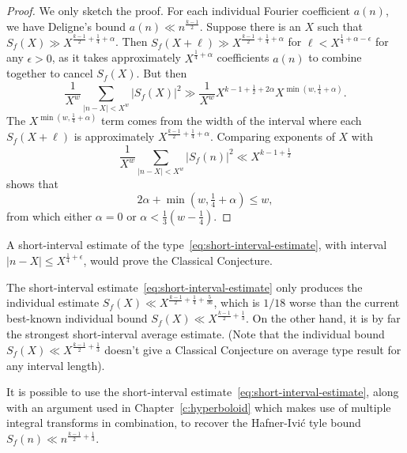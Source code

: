 \begin{proof}
  We only sketch the proof.
  For each individual Fourier coefficient $a(n)$, we have Deligne's bound $a(n) \ll
  n^{\frac{k-1}{2}}$.
  Suppose there is an $X$ such that $S_f(X) \gg X^{\frac{k-1}{2} + \frac{1}{4} + \alpha}$.
  Then $S_f(X + \ell) \gg X^{\frac{k-1}{2} + \frac{1}{4} + \alpha}$ for $\ell <
  X^{\frac{1}{4} + \alpha - \epsilon}$ for any $\epsilon > 0$, as it takes approximately
  $X^{\frac{1}{4} + \alpha}$ coefficients $a(n)$ to combine together to cancel $S_f(X)$.
  But then
  \begin{equation}
    \frac{1}{X^w} \sum_{\lvert n - X \rvert < X^w} \lvert S_f(X) \rvert^2 \gg
    \frac{1}{X^w} X^{k-1 + \frac{1}{2} + 2\alpha} X^{\min(w, \frac{1}{4} + \alpha)}.
  \end{equation}
  The $X^{\min(w, \frac{1}{4} + \alpha)}$ term comes from the width of the interval where
  each $S_f(X + \ell)$ is approximately $X^{\frac{k-1}{2} + \frac{1}{4} + \alpha}$.
  Comparing exponents of $X$ with
  \begin{equation}
    \frac{1}{X^w} \sum_{\lvert n - X \rvert < X^w} \lvert S_f(n) \rvert^2 \ll X^{k - 1 +
    \frac{1}{2}}
  \end{equation}
  shows that
  \begin{equation}
    2\alpha + \min(w, \tfrac{1}{4} + \alpha) \leq w,
  \end{equation}
  from which either $\alpha = 0$ or $\alpha < \tfrac{1}{3}( w - \tfrac{1}{4})$.
\end{proof}


\begin{corollary}
  A short-interval estimate of the type~\eqref{eq:short-interval-estimate}, with interval
  $\lvert n-X \rvert \leq X^{\frac{1}{4} + \epsilon}$, would prove the Classical
  Conjecture.
\end{corollary}

The short-interval estimate~\eqref{eq:short-interval-estimate} only produces the
individual estimate $S_f(X) \ll X^{\frac{k-1}{2} + \frac{1}{4} + \frac{5}{36}}$, which is
$1/18$ worse than the current best-known individual bound $S_f(X) \ll X^{\frac{k-1}{2} +
\frac{1}{3}}$.
On the other hand, it is by far the strongest short-interval average estimate.
(Note that the individual bound $S_f(X) \ll X^{\frac{k-1}{2} + \frac{1}{3}}$ doesn't give
a Classical Conjecture on average type result for any interval length).


\begin{remark}
  It is possible to use the short-interval estimate~\eqref{eq:short-interval-estimate},
  along with an argument used in Chapter~\ref{c:hyperboloid} which makes use of multiple
  integral transforms in combination, to recover the Hafner-Ivi\'c tyle bound $S_f(n) \ll
  n^{\frac{k-1}{2} + \frac{1}{3}}$.
\end{remark}



